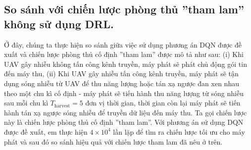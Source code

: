 \documentclass{uetgraduation}
\begin{document}
\subsection{So sánh với chiến lược phòng thủ ''tham lam'' không sử dụng DRL.}
Ở đây, chúng ta thực hiện so sánh giữa việc sử dụng phương án DQN được đề xuất và chiến lược phòng thủ cố định ''tham lam'' được mô tả như sau: (i) Khi
UAV gây nhiễu không tấn công kênh truyền, máy phát sẽ phát chủ động gói tin đến máy thu, (ii) Khi UAV gây nhiễu tấn công kênh truyền, máy phát sẽ tận dụng
sóng nhiễu từ UAV để thu năng lượng hoặc tán xạ ngược đan xen nhau theo một chu kì cố định - máy phát sẽ tiến hành thu năng lượng từ sóng nhiễu sau mỗi chu kì
$T_\text{harvest} = 5$ đơn vị thời gian, thời gian còn lại máy phát sẽ tiến hành tán xạ ngược sóng nhiễu để truyền dữ liệu đến máy thu. Ta gọi chiến lược này
là chiến lược phòng thủ cố định ''tham lam''. Với phương án sử dụng DQN được đề xuất, em thực hiện $4 \times 10^4$ lần lặp để tìm ra chiến lược tối ưu cho máy
phát và sau đó so sánh hiệu quả với chiến lược tham lam đã nêu ở trên.
\end{document}
